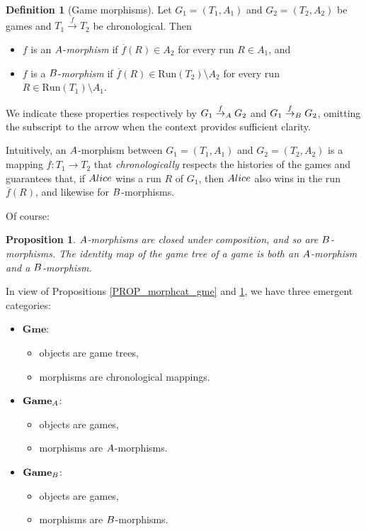 \documentclass[12pt]{amsart}
\newtheorem{prop}[thm]{Proposition}
\theoremstyle{definition}
\newtheorem{defn}[thm]{Definition}
\newcommand{\ali}{\textup{\textmd{\textsc{Alice}}}}
\newcommand{\A}{\textup{\textmd{\textsc{A}}}}
\newcommand{\B}{\textup{\textmd{\textsc{B}}}}
\newcommand{\Run}{{\mathrm{Run}}}
\newcommand{\Games}{\mathbf{Game}}
\newcommand{\Gmes}{\mathbf{Gme}}
\begin{document}
\begin{defn}[Game morphisms]\label{DEF_Amorph}
	Let $G_1=(T_1,A_1)$ and $G_2=(T_2,A_2)$ be games and $T_1\stackrel{f}{\to}T_2$ be chronological. Then 
	\begin{itemize}
		\item[(A)] $f$ is an $\A$-\textit{morphism} if $\overline{f}(R)\in A_2$ for every run $R\in A_1$, and
		\item[(B)] $f$ is a $\B$-\textit{morphism} if $\overline{f}(R)\in \Run(T_2)\setminus A_2$ for every run $R\in \Run(T_1)\setminus A_1$.
	\end{itemize}
	We indicate these properties respectively by $G_1\stackrel{f}{\to}_\A G_2$ and $G_1\stackrel{f}{\to}_\B G_2$, omitting the subscript to the arrow when the context provides sufficient clarity.		
\end{defn} 


Intuitively, an $\A$-morphism between $G_1=(T_1, A_1)$ and $G_2=(T_2, A_2)$ is a mapping $f\colon T_1\to T_2$ that \textit{chronologically} respects the histories of the games and guarantees that, if $\ali$ wins a run $R$ of $G_1$, then $\ali$ also wins in the run $\overline{f}(R)$, and likewise for $\B$-morphisms. 

Of course: 


\begin{prop}\label{PROP_morphcat}
	$\A$-morphisms are closed under composition, and so are $\B$-morphisms. The identity map of the game tree of a game is both an $\A$-morphism and a $\B$-morphism.
\end{prop}


In view of Propositions \ref{PROP_morphcat_gme} and \ref{PROP_morphcat}, we have three emergent categories: 

\begin{itemize}
	\item $\Gmes$: 
	\begin{itemize}
		\item objects are game trees,
		\item morphisms are chronological mappings.
	\end{itemize}
	\item $\Games_\A$: 
	\begin{itemize}
		\item objects are games,
		\item morphisms are $\A$-morphisms.
	\end{itemize}
	\item $\Games_\B$: 
	\begin{itemize}
		\item objects are games,
		\item morphisms are $\B$-morphisms.
	\end{itemize}  
\end{itemize} 
\end{document}
